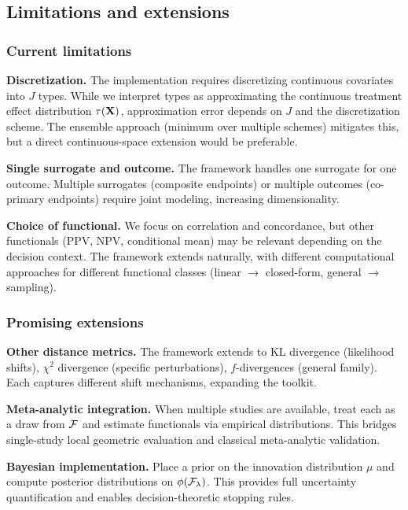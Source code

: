\documentclass{article}
\begin{document}
\subsection{Limitations and extensions}

\subsubsection{Current limitations}

\textbf{Discretization.} The implementation requires discretizing continuous covariates into $J$ types. While we interpret types as approximating the continuous treatment effect distribution $\tau(\mathbf{X})$, approximation error depends on $J$ and the discretization scheme. The ensemble approach (minimum over multiple schemes) mitigates this, but a direct continuous-space extension would be preferable.

\textbf{Single surrogate and outcome.} The framework handles one surrogate for one outcome. Multiple surrogates (composite endpoints) or multiple outcomes (co-primary endpoints) require joint modeling, increasing dimensionality.

\textbf{Choice of functional.} We focus on correlation and concordance, but other functionals (PPV, NPV, conditional mean) may be relevant depending on the decision context. The framework extends naturally, with different computational approaches for different functional classes (linear $\rightarrow$ closed-form, general $\rightarrow$ sampling).

\subsubsection{Promising extensions}

\textbf{Other distance metrics.} The framework extends to KL divergence (likelihood shifts), $\chi^2$ divergence (specific perturbations), $f$-divergences (general family). Each captures different shift mechanisms, expanding the toolkit.

\textbf{Meta-analytic integration.} When multiple studies are available, treat each as a draw from $\mathcal{F}$ and estimate functionals via empirical distributions. This bridges single-study local geometric evaluation and classical meta-analytic validation.

\textbf{Bayesian implementation.} Place a prior on the innovation distribution $\mu$ and compute posterior distributions on $\phi(\mathcal{F}_\lambda)$. This provides full uncertainty quantification and enables decision-theoretic stopping rules.
\end{document}
